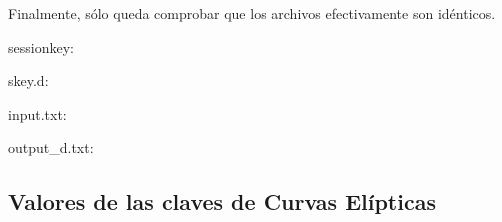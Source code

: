 \documentclass[a4paper, 11pt]{article}
\begin{document}
		Finalmente, sólo queda comprobar que los archivos efectivamente son idénticos.
		
		sessionkey:
		
		
		skey.d:
		
		
		input.txt:
		
		
		output\_d.txt:
		
	
	\subsection{Valores de las claves de Curvas Elípticas}
		
		
		
\end{document}
